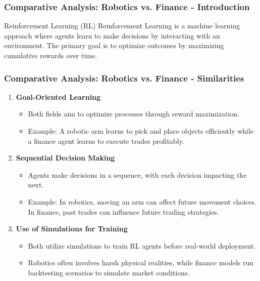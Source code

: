 \documentclass[aspectratio=169]{beamer}
\begin{document}
\begin{frame}[fragile]
    \frametitle{Comparative Analysis: Robotics vs. Finance - Introduction}
    \begin{block}{Reinforcement Learning (RL)}
        Reinforcement Learning is a machine learning approach where agents learn to make decisions by interacting with an environment. The primary goal is to optimize outcomes by maximizing cumulative rewards over time.
    \end{block}
\end{frame}

\begin{frame}[fragile]
    \frametitle{Comparative Analysis: Robotics vs. Finance - Similarities}
    \begin{enumerate}
        \item \textbf{Goal-Oriented Learning}
        \begin{itemize}
            \item Both fields aim to optimize processes through reward maximization.
            \item Example: A robotic arm learns to pick and place objects efficiently while a finance agent learns to execute trades profitably.
        \end{itemize}
        
        \item \textbf{Sequential Decision Making}
        \begin{itemize}
            \item Agents make decisions in a sequence, with each decision impacting the next.
            \item Example: In robotics, moving an arm can affect future movement choices. In finance, past trades can influence future trading strategies.
        \end{itemize}
        
        \item \textbf{Use of Simulations for Training}
        \begin{itemize}
            \item Both utilize simulations to train RL agents before real-world deployment.
            \item Robotics often involves harsh physical realities, while finance models run backtesting scenarios to simulate market conditions.
        \end{itemize}
    \end{enumerate}
\end{frame}
\end{document}

